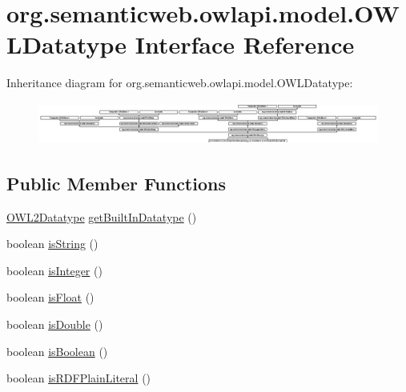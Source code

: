 \hypertarget{interfaceorg_1_1semanticweb_1_1owlapi_1_1model_1_1_o_w_l_datatype}{\section{org.\-semanticweb.\-owlapi.\-model.\-O\-W\-L\-Datatype Interface Reference}
\label{interfaceorg_1_1semanticweb_1_1owlapi_1_1model_1_1_o_w_l_datatype}
}
Inheritance diagram for org.\-semanticweb.\-owlapi.\-model.\-O\-W\-L\-Datatype\-:\begin{figure}[H]
\begin{center}
\leavevmode
\includegraphics[height=1.400500cm]{interfaceorg_1_1semanticweb_1_1owlapi_1_1model_1_1_o_w_l_datatype}
\end{center}
\end{figure}
\subsection*{Public Member Functions}
\begin{DoxyCompactItemize}
\item 
\hyperlink{enumorg_1_1semanticweb_1_1owlapi_1_1vocab_1_1_o_w_l2_datatype}{O\-W\-L2\-Datatype} \hyperlink{interfaceorg_1_1semanticweb_1_1owlapi_1_1model_1_1_o_w_l_datatype_a54e1a1487dc6604d9f0cc67e5dcee551}{get\-Built\-In\-Datatype} ()
\item 
boolean \hyperlink{interfaceorg_1_1semanticweb_1_1owlapi_1_1model_1_1_o_w_l_datatype_a1779b19f1d2352f1480be8bd751ed6d3}{is\-String} ()
\item 
boolean \hyperlink{interfaceorg_1_1semanticweb_1_1owlapi_1_1model_1_1_o_w_l_datatype_a80479a9acfabe8990bb00eb9bef82c96}{is\-Integer} ()
\item 
boolean \hyperlink{interfaceorg_1_1semanticweb_1_1owlapi_1_1model_1_1_o_w_l_datatype_a7584fda405cf05f776cb752d40860759}{is\-Float} ()
\item 
boolean \hyperlink{interfaceorg_1_1semanticweb_1_1owlapi_1_1model_1_1_o_w_l_datatype_a57baff298816efeb7ff7ad02729d38d1}{is\-Double} ()
\item 
boolean \hyperlink{interfaceorg_1_1semanticweb_1_1owlapi_1_1model_1_1_o_w_l_datatype_aa8e8433373357df58a9d2dbbce346767}{is\-Boolean} ()
\item 
boolean \hyperlink{interfaceorg_1_1semanticweb_1_1owlapi_1_1model_1_1_o_w_l_datatype_a6da117ba964bf5f8f17e9e28a0e14d24}{is\-R\-D\-F\-Plain\-Literal} ()
\end{DoxyCompactItemize}


